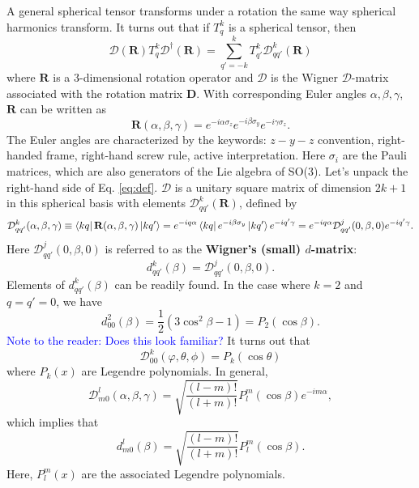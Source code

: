 \documentclass[11pt]{article}
\newcommand{\al}{\alpha}
\newcommand{\be}{\beta}
\newcommand{\f}[2]{\frac{#1}{#2}}
\begin{document}
\begin{appendices}
A general spherical tensor transforms under a rotation the same way spherical harmonics transform. It turns out that if $T^k_q$ is a spherical tensor, then 
\begin{equation}\label{eq:def}
\mathcal{D}(\mathbf{R})T^k_q \mathcal{D}^\dagger(\mathbf{R}) = \sum_{q' = -k}^k T^k_{q'} \mathcal{D}^k_{qq'}(\mathbf{R}) 
\end{equation}
where $\mathbf{R}$ is a 3-dimensional rotation operator and $\mathcal{D}$ is the Wigner $\mathcal{D}$-matrix associated with the rotation matrix $\mathbf{D}$. With corresponding Euler angles $\al,\be,\gamma$, $\mathbf{R}$ can be written as 
\begin{equation*}
\mathbf{R}(\al,\be,\gamma) = e^{-i\al \sigma_z}e^{-i\beta \sigma_y} e^{-i\gamma \sigma_z}.
\end{equation*}
The Euler angles are characterized by the keywords: $z-y-z$ convention, right-handed frame, right-hand screw rule, active interpretation. Here $\sigma_i$ are the Pauli matrices, which are also generators of the Lie algebra of SO(3). Let's unpack the right-hand side of Eq. \ref{eq:def}. $\mathcal{D}$ is a unitary square matrix of dimension $2k+1$ in this spherical basis with elements $\mathcal{D}^k_{qq'}(\mathbf{R})$, defined by 
\begin{equation*}
\mathcal{D}^k_{qq'}(\al,\be,\gamma) \equiv \bra{kq} \mathbf{R}(\al,\be,\gamma) \ket{kq'} = e^{-iq\al} \bra{kq} e^{-i\be \sigma_y} \ket{kq'} e^{-iq'\gamma} = e^{-iq\al} \mathcal{D}^j_{qq'}(0,\be,0) e^{-iq'\gamma}.
\end{equation*}
Here $\mathcal{D}^j_{qq'}(0,\be,0)$ is referred to as the \textbf{Wigner's (small) $d$-matrix}:
\begin{equation*}
d^k_{qq'}(\be) = \mathcal{D}^j_{qq'}(0,\be,0).
\end{equation*}
Elements of $d^k_{qq'}(\be)$ can be readily found. In the case where $k = 2$ and $q=q' =0$, we have
\begin{equation*}
d^2_{00}(\be) = \f{1}{2}(3\cos^2\be - 1) = P_2(\cos\beta).
\end{equation*}
\textcolor{blue}{Note to the reader: Does this look familiar?} It turns out that 
\begin{equation*}
\mathcal{D}^k_{00}(\varphi,\theta,\phi) = P_k(\cos\theta)
\end{equation*}
where $P_k(x)$ are Legendre polynomials. In general, 
\begin{equation*}
\mathcal{D}^l_{m0}(\al,\be,\gamma) = \sqrt{\f{(l-m)!}{(l+m)!}} P^m_l(\cos\beta) e^{-im\al},
\end{equation*}
which implies that
\begin{equation*}
d^l_{m0}(\be) = \sqrt{\f{(l-m)!}{(l+m)!}} P^m_l(\cos\beta).
\end{equation*}
Here, $P^m_l(x)$ are the associated Legendre polynomials. 








\end{appendices}









\end{document}
